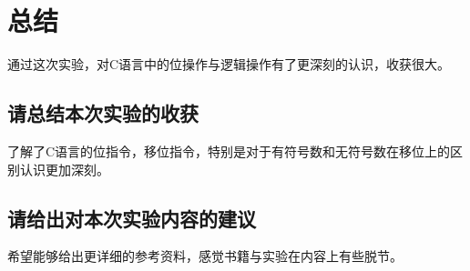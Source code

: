 \section{总结}
通过这次实验，对C语言中的位操作与逻辑操作有了更深刻的认识，收获很大。

\subsection{请总结本次实验的收获}
了解了C语言的位指令，移位指令，特别是对于有符号数和无符号数在移位上的区别认识更加深刻。

\subsection{请给出对本次实验内容的建议}
希望能够给出更详细的参考资料，感觉书籍与实验在内容上有些脱节。

